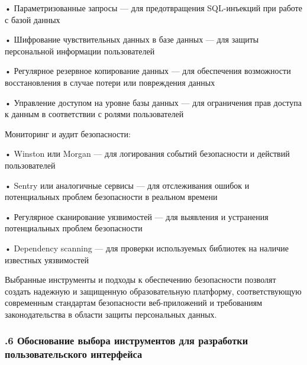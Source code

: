 {  \par \redline • Параметризованные запросы — для предотвращения SQL-инъекций при работе с базой данных
  \par \redline • Шифрование чувствительных данных в базе данных — для защиты персональной информации пользователей
  \par \redline • Регулярное резервное копирование данных — для обеспечения возможности восстановления в случае потери или повреждения данных
  \par \redline • Управление доступом на уровне базы данных — для ограничения прав доступа к данным в соответствии с ролями пользователей

  \par \redline Мониторинг и аудит безопасности:

  \par \redline • Winston или Morgan — для логирования событий безопасности и действий пользователей
  \par \redline • Sentry или аналогичные сервисы — для отслеживания ошибок и потенциальных проблем безопасности в реальном времени
  \par \redline • Регулярное сканирование уязвимостей — для выявления и устранения потенциальных проблем безопасности
  \par \redline • Dependency scanning — для проверки используемых библиотек на наличие известных уязвимостей

  \par \redline Выбранные инструменты и подходы к обеспечению безопасности позволят создать надежную и защищенную образовательную платформу, соответствующую современным стандартам безопасности веб-приложений и требованиям законодательства в области защиты персональных данных.

  \par
}

\subtitlespace

\subsubsection*{ 
  \gostTitleFont
  .6 Обоснование выбора инструментов для разработки пользовательского интерфейса
} 

\subtitlespace

